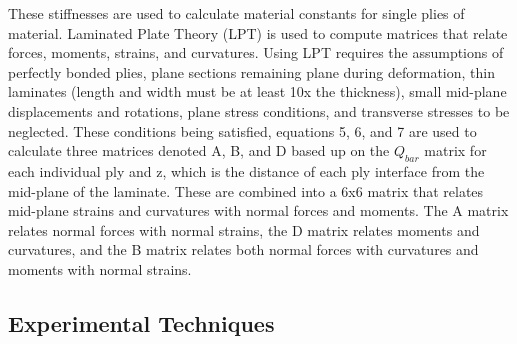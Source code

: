 \documentclass[12pt]{article}
\begin{document}
These stiffnesses are used to calculate material constants for single plies of material. Laminated Plate Theory (LPT) is used to compute matrices that relate forces, moments, strains, and curvatures. Using LPT requires the assumptions of perfectly bonded plies, plane sections remaining plane during deformation, thin laminates (length and width must be at least 10x the thickness), small mid-plane displacements and rotations, plane stress conditions, and transverse stresses to be neglected. These conditions being satisfied, equations 5, 6, and 7 are used to calculate three matrices denoted A, B, and D based up on the $Q_{bar}$ matrix for each individual ply and z, which is the distance of each ply interface from the mid-plane of the laminate. These are combined into a 6x6 matrix that relates mid-plane strains and curvatures with normal forces and moments. The A matrix relates normal forces with normal strains, the D matrix relates moments and curvatures, and the B matrix relates both normal forces with curvatures and moments with normal strains.


\subsection{Experimental Techniques} %
\end{document}
